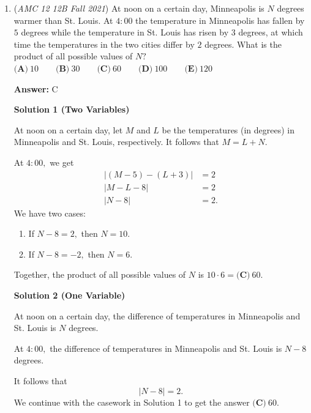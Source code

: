\begin{enumerate}
We have $4$ lattice points in the interior and $6$ lattice points on the boundary. By \href{https://artofproblemsolving.com/wiki/index.php?title=Pick\%27s\_Theorem}{Pick's Theorem}, the area of the shaded figure is 
 \[4+\frac{6}{2}-1 = 4+3-1 = \boxed{\textbf{(B)} \: 6}.\]~danprathab

 


	\item (\textit{AMC 12 12B Fall 2021}) At noon on a certain day, Minneapolis is $N$ degrees warmer than St. Louis. At $4{:}00$ the temperature in Minneapolis has fallen by $5$ degrees while the temperature in St. Louis has risen by $3$ degrees, at which time the temperatures in the two cities differ by $2$ degrees. What is the product of all possible values of $N?$
$\textbf{(A)}\: 10\qquad\textbf{(B)} \: 30\qquad\textbf{(C)} \: 60\qquad\textbf{(D)} \: 100\qquad\textbf{(E)} \: 120$

 \textbf{Answer: }C



\textbf{Solution 1 (Two Variables)}

At noon on a certain day, let $M$ and $L$ be the temperatures (in degrees) in Minneapolis and St. Louis, respectively. It follows that $M=L+N.$

 At $4{:}00,$ we get
 \begin{align*} |(M-5)-(L+3)| &= 2 \\ |M-L-8| &= 2 \\ |N-8| &= 2. \end{align*}
We have two cases:

 
            \begin{enumerate} 
        \item If $N-8=2,$ then $N=10.$

        \item If $N-8=-2,$ then $N=6.$

            \end{enumerate}
            Together, the product of all possible values of $N$ is $10\cdot6=\boxed{\textbf{(C)} \: 60}.$




\textbf{Solution 2 (One Variable)}

At noon on a certain day, the difference of temperatures in Minneapolis and St. Louis is $N$ degrees.

 At $4{:}00,$ the difference of temperatures in Minneapolis and St. Louis is $N-8$ degrees.

 It follows that 
 \[|N-8|=2.\]We continue with the casework in Solution 1 to get the answer $\boxed{\textbf{(C)} \: 60}.$





\end{enumerate}
